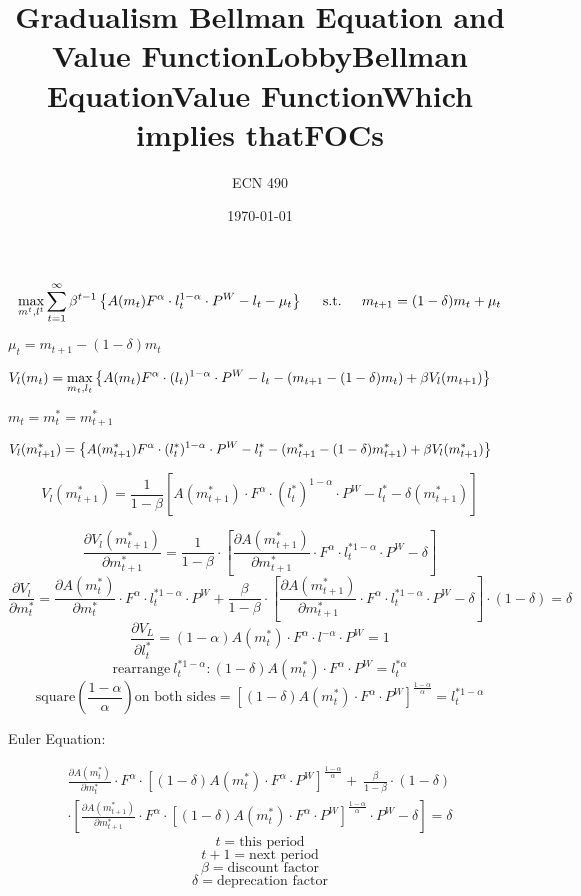 \documentclass[12pt]{article}
\begin{document}
\title{\vskip-0.6in Gradualism Bellman Equation and Value Function}
\author{ECN 490}
\date{\today}
\maketitle

\title{Lobby}
\[
\max_{m^t,l^t} \sum_{t=1}^\infty \beta^{t-1}\left\{A(m_t)F^\alpha\cdot l^{1-\alpha}_t\cdot P^W-l_t-\mu_t
  \right\} \hskip.2in \text{s.t.} \hskip.2in  m_{t+1}=(1-\delta)m_{t}+\mu_t
\]
\begin{center} $\mu_t=m_{t+1}-(1-\delta)m_{t}$\end{center}

\title{Bellman Equation}
\[
  V_l(m_t)=\max_{m_t,l_t}\left\{A(m_t)F^\alpha\cdot (l_t)^{1-\alpha}\cdot P^W-l_t-(m_{t+1}-(1-\delta)m_t)+\beta V_l(m_{t+1})
  \right\} \hskip.2in 
\]
\begin{center} $m_t=m_t^\ast=m^\ast_{t+1}$\end{center}
\title{Value Function}
\[
  V_l(m_{t+1}^\ast)=\left\{A(m_{t+1}^\ast)F^\alpha\cdot (l^\ast_t)^{1-\alpha}\cdot P^W-l_t^\ast-(m^\ast_{t+1}-(1-\delta)m^\ast_{t+1})+\beta V_l(m^\ast_{t+1})
 \right\} \hskip.2in
\]
\begin{center}\title{Which implies that}\end{center}
\[V_l(m_{t+1}^\ast)=\frac{1}{1-\beta}\left[ A(m_{t+1}^\ast)\cdot F^\alpha\cdot (l^\ast_t)^{1-\alpha}\cdot P^W-l^\ast_t-\delta(m^\ast_{t+1})\right]\]
\title{FOCs}

\[\frac{\partial V_l(m^\ast_{t+1})}{\partial m^\ast_{t+1}}=\frac{1}{1-\beta}\cdot \left[\frac{\partial A(m^\ast_{t+1})}{\partial m^\ast_{t+1}}\cdot F^\alpha \cdot l^{\ast 1-\alpha}_t \cdot P^W-\delta\right]
\]
\[\frac{\partial V_l}{\partial m^\ast_t}=\frac{\partial A(m^\ast_t)}{\partial m^\ast_t} \cdot F^\alpha \cdot l^{\ast 1-\alpha}_t \cdot P^W+\frac{\beta}{1-\beta}\cdot \left[\frac{\partial A(m^\ast_{t+1})}{\partial m^\ast_{t+1}}\cdot F^\alpha \cdot l^{\ast 1-\alpha}_t \cdot P^W-\delta\right]\cdot(1-\delta)=\delta
\]
\[
\frac{\partial V_L}{\partial l^\ast_t}= (1-\alpha) A(m^\ast_t) \cdot F^\alpha \cdot l^{-\alpha} \cdot P^W =1
\]
\[
\text{rearrange}\ l^{\ast 1-\alpha}_t: (1-\delta)A(m^\ast_t)\cdot F^\alpha \cdot P^W=l^{\ast \alpha}_t
\]
\[
\text{square}\left(\frac{1-\alpha}{\alpha}\right)\text{on both sides}=\left[(1-\delta)A(m^\ast_t)\cdot F^\alpha \cdot P^W\right]^\frac{1-\alpha}{\alpha}= l^{\ast 1-\alpha}_t 
\]
\begin{flushleft}
Euler Equation:
\end{flushleft}
\begin{multline}
\frac{\partial A(m^\ast_t)}{\partial m^\ast_t} \cdot F^\alpha \cdot \left[(1-\delta)A(m^\ast_t)\cdot F^\alpha \cdot P^W\right]^\frac{1-\alpha}{\alpha}+ \
\frac{\beta}{1-\beta}\cdot (1-\delta)\\\cdot\left[\frac{\partial A(m^\ast_{t+1})}{\partial m^\ast_{t+1}}\cdot F^\alpha\cdot \left[(1-\delta)A(m^\ast_t)\cdot F^\alpha\cdot P^W\right]^\frac{1-\alpha}{\alpha}\cdot P^W-\delta\right]=\delta
\end{multline}
\[
t=\text{this period}
\]
\[
t+1=\text{next period}
\]
\[
\beta=\text{discount factor}
\]
\[
\delta=\text{deprecation factor}
\]
\end{document}
